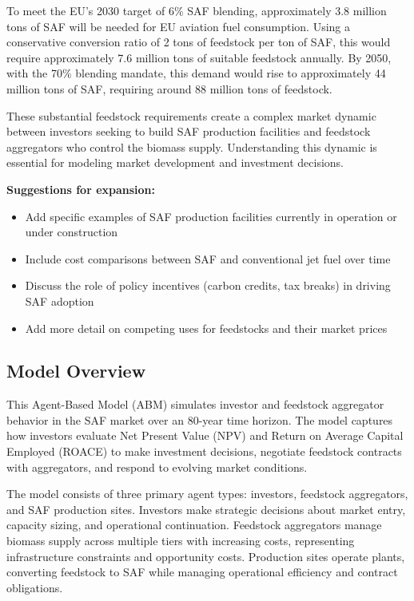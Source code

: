 \documentclass[10.5pt]{article}
\begin{document}
To meet the EU's 2030 target of 6\% SAF blending, approximately 3.8 million tons of SAF will be needed for EU aviation fuel consumption. Using a conservative conversion ratio of 2 tons of feedstock per ton of SAF, this would require approximately 7.6 million tons of suitable feedstock annually. By 2050, with the 70\% blending mandate, this demand would rise to approximately 44 million tons of SAF, requiring around 88 million tons of feedstock.

These substantial feedstock requirements create a complex market dynamic between investors seeking to build SAF production facilities and feedstock aggregators who control the biomass supply. Understanding this dynamic is essential for modeling market development and investment decisions.

\textbf{Suggestions for expansion:}
\begin{itemize}
    \item Add specific examples of SAF production facilities currently in operation or under construction
    \item Include cost comparisons between SAF and conventional jet fuel over time
    \item Discuss the role of policy incentives (carbon credits, tax breaks) in driving SAF adoption
    \item Add more detail on competing uses for feedstocks and their market prices
\end{itemize}

\subsection{Model Overview}

This Agent-Based Model (ABM) simulates investor and feedstock aggregator behavior in the SAF market over an 80-year time horizon. The model captures how investors evaluate Net Present Value (NPV) and Return on Average Capital Employed (ROACE) to make investment decisions, negotiate feedstock contracts with aggregators, and respond to evolving market conditions.

The model consists of three primary agent types: investors, feedstock aggregators, and SAF production sites. Investors make strategic decisions about market entry, capacity sizing, and operational continuation. Feedstock aggregators manage biomass supply across multiple tiers with increasing costs, representing infrastructure constraints and opportunity costs. Production sites operate plants, converting feedstock to SAF while managing operational efficiency and contract obligations.
\end{document}
